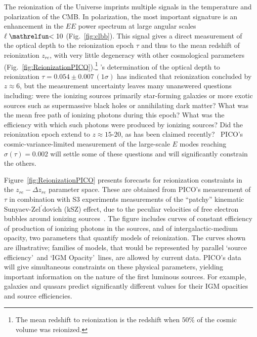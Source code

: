 \documentclass[PICOReport.tex]{subfiles}
\begin{document}
The reionization of the Universe imprints multiple signals in the temperature and polarization of the CMB.  In polarization, the most important signature is an enhancement in the $EE$ power spectrum at large angular scales $\ell \simlt 10$ (Fig.~\ref{fig:clbb}). This signal gives a direct measurement of the optical depth to the reionization epoch $\tau$ and thus to the mean redshift of reionization $z_{re}$, with very little degeneracy with other cosmological parameters (Fig.~\ref{fig:ReionizationPICO}).\footnote{The mean redshift to reionization is the redshift when $50$\% of the cosmic volume was reionized.} \planck 's determination of the optical depth to reionization $\tau = 0.054 \pm 0.007\, (1\sigma) $ has indicated that reionization concluded by $z \approx 6$, but the measurement uncertainty leaves many unanswered questions including: were the ionizing sources primarily star-forming galaxies or more exotic sources such as supermassive black holes or annihilating dark matter? What was the mean free path of ionizing photons during this epoch?  What was the efficiency with which such photons were produced by ionizing sources?  
Did the reionization epoch extend to $z \approx 15$-$20$, as has been claimed recently?~\citep{Miranda2017} PICO's cosmic-variance-limited measurement of the large-scale $E$ modes reaching $\sigma(\tau)=0.002$ will settle some of these questions and will significantly constrain the others.

Figure~\ref{fig:ReionizationPICO} presents forecasts for reionization constraints in the $z_{re} - \Delta z_{re}$ parameter space. These are obtained from PICO's measurement of $\tau$ in combination with S3 experiments measurements of the ``patchy'' kinematic Sunyaev-Zel$^{\prime}$dovich (kSZ) effect, due to the peculiar velocities of free electron bubbles around ionizing sources~\citep{Calabrese2014}.
The figure includes curves of constant efficiency of production of ionizing photons in the sources, and of intergalactic-medium opacity, two parameters that quantify models of reionization. The curves shown are illustrative; families of models, that would be represented by parallel \lq source efficiency\rq~and \lq IGM Opacity\rq~lines, are allowed by current data. PICO's data will give simultaneous constraints on these physical parameters, yielding important information on the nature of the first luminous sources. For example, galaxies and quasars predict significantly different values for their IGM opacities and source efficiencies.  
\end{document}
